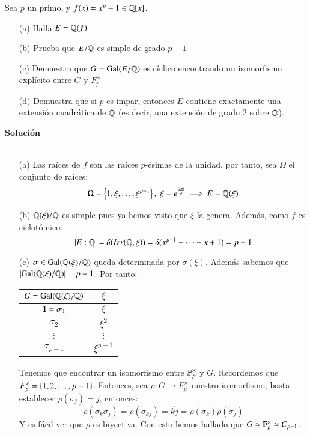 \begin{ex}[H4.7]
    Sea $p$ un primo, y $f(x) = x^p - 1 \in \mathbb{Q}[x]$.
    \begin{itemize}
        \item[(a)] Halla $E = \mathbb{Q}(f)$
        \item[(b)] Prueba que $E/\mathbb{Q}$ es simple de grado $p - 1$
        \item[(c)] Demuestra que $G = \mathrm{Gal}(E/\mathbb{Q})$ es cíclico encontrando un isomorfismo explícito entre $G$ y $F_p^\times$
        \item[(d)] Demuestra que si $p$ es impar, entonces $E$ contiene exactamente una extensión cuadrática de $\mathbb{Q}$ (es decir, una extensión de grado $2$ sobre $\mathbb{Q}$).
    \end{itemize}

    \textbf{Solución}\\\\
    \begin{itemize}
        \item[(a)] Las raíces de $f$ son las raíces $p$-ésimas de la unidad, por tanto, sea $\Omega$ el conjunto de raíces:
        $$
            \Omega = \left\{1, \xi, \ldots, \xi^{p-1}\right\},\ \xi = e^{\frac{2\pi i}{p}} \implies E = \mathbb{Q}(\xi)
        $$
        \item[(b)] $\mathbb{Q}(\xi)/\mathbb{Q}$ es simple pues ya hemos visto que $\xi$ la genera. Además, como $f$ es ciclotómico:
        $$
            \left|E:\mathbb{Q}\right| = \delta(Irr(\mathbb{Q}, \xi)) = \delta(x^{p-1} + \cdots + x + 1) = p-1
        $$
        \item[(c)] $\sigma \in \mathrm{Gal}(\mathbb{Q}(\xi)/\mathbb{Q})$ queda determinada por $\sigma(\xi)$. Además sabemos que $\left|\mathrm{Gal}(\mathbb{Q}(\xi)/\mathbb{Q})\right| = p-1$. Por tanto:\\
        \begin{center}
            \begin{tabular}{|c|c|}
            \hline
            $G = \mathrm{Gal}(\mathbb{Q}(\xi)/\mathbb{Q}) $ & $ \xi $\\ \hline \hline
            $\mathbf{1} = \sigma_1 $ & $ \xi $\\ \hline
            $\sigma_2 $ & $ \xi^2 $\\ \hline
            $\vdots $ & $ \vdots $\\ \hline
            $\sigma_{p-1} $ & $ \xi^{p-1} $\\ \hline
            \end{tabular}
        \end{center}
        Tenemos que encontrar un isomorfismo entre $\mathbb{F}_p^\times$ y $G$. Recordemos que $F_p^\times = \left\{1, 2, \ldots, p-1\right\}$. Entonces, sea $\rho: G \to F_p^\times$ nuestro isomorfismo, basta establecer $\rho(\sigma_j) = j$, entonces:
        $$
            \rho(\sigma_k \sigma_j) = \rho(\sigma_{kj}) = \overline{kj} = \rho(\sigma_k) \rho(\sigma_j)
        $$
        Y es fácil ver que $\rho$ es biyectiva. Con esto hemos hallado que $G \simeq \mathbb{F}_p^\times \simeq C_{p-1}$.


\end{itemize}
\end{ex}

